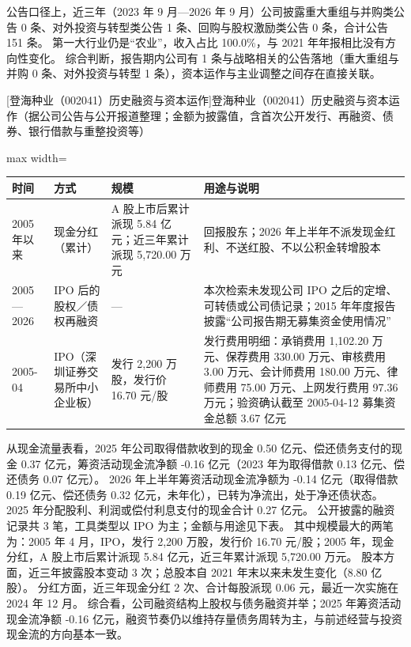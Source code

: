  公告口径上，近三年（2023 年 9 月---2026 年 9 月）公司披露重大重组与并购类公告 0 条、对外投资与转型类公告 1 条、回购与股权激励类公告 0 条，合计公告 151 条。 第一大行业仍是“农业”，收入占比 100.0\%，与 2021 年年报相比没有方向性变化。 综合判断，报告期内公司有 1 条与战略相关的公告落地（重大重组与并购 0 条、对外投资与转型 1 条），资本运作与主业调整之间存在直接关联。

\begin{center}\small\setlength{\tabcolsep}{4pt}
[登海种业（002041）历史融资与资本运作]{登海种业（002041）历史融资与资本运作（据公司公告与公开报道整理；金额为披露值，含首次公开发行、再融资、债券、银行借款与重整投资等）}
\begin{adjustbox}{max width=\textwidth}
\begin{tabular}{@{}p{1.45cm}p{2.55cm}p{4.05cm}p{4.95cm}@{}}
\toprule
时间 & 方式 & 规模 & 用途与说明 \\
\midrule
2005 年以来 & 现金分红（累计） & A 股上市后累计派现 5.84 亿元；近三年累计派现 5,\allowbreak{}720.00 万元 & 回报股东；2026 年上半年不派发现金红利、\allowbreak{}不送红股、\allowbreak{}不以公积金转增股本 \\
2005—2026 & IPO 后的股权／债权再融资 & --- & 本次检索未发现公司 IPO 之后的定增、\allowbreak{}可转债或公司债记录；2015 年年度报告披露“公司报告期无募集资金使用情况” \\
2005-04 & IPO（深圳证券交易所中小企业板） & 发行 2,\allowbreak{}200 万股，\allowbreak{}发行价 16.70 元/\allowbreak{}股 & 发行费用明细：承销费用 1,\allowbreak{}102.20 万元、\allowbreak{}保荐费用 330.00 万元、\allowbreak{}审核费用 3.00 万元、\allowbreak{}会计师费用 180.00 万元、\allowbreak{}律师费用 75.00 万元、\allowbreak{}上网发行费用 97.36 万元；验资确认截至 2005-04-12 募集资金总额 3.67 亿元 \\
\bottomrule
\end{tabular}
\end{adjustbox}
\end{center}

 从现金流量表看，2025 年公司取得借款收到的现金 0.50 亿元、偿还债务支付的现金 0.37 亿元，筹资活动现金流净额 -0.16 亿元（2023 年为取得借款 0.13 亿元、偿还债务 0.07 亿元）。 2026 年上半年筹资活动现金流净额为 -0.14 亿元（取得借款 0.19 亿元、偿还债务 0.32 亿元，未年化），已转为净流出，处于净还债状态。 2025 年分配股利、利润或偿付利息支付的现金合计 0.27 亿元。 公开披露的融资记录共 3 笔，工具类型以 IPO 为主；金额与用途见下表。 其中规模最大的两笔为：2005 年 4 月，IPO，发行 2,200 万股，发行价 16.70 元/股；2005 年，现金分红，A 股上市后累计派现 5.84 亿元，近三年累计派现 5,720.00 万元。 股本方面，近三年披露股本变动 3 次；总股本自 2021 年末以来未发生变化（8.80 亿股）。 分红方面，近三年现金分红 2 次、合计每股派现 0.06 元，最近一次实施在 2024 年 12 月。 综合看，公司融资结构上股权与债务融资并举；2025 年筹资活动现金流净额 -0.16 亿元，融资节奏仍以维持存量债务周转为主，与前述经营与投资现金流的方向基本一致。


